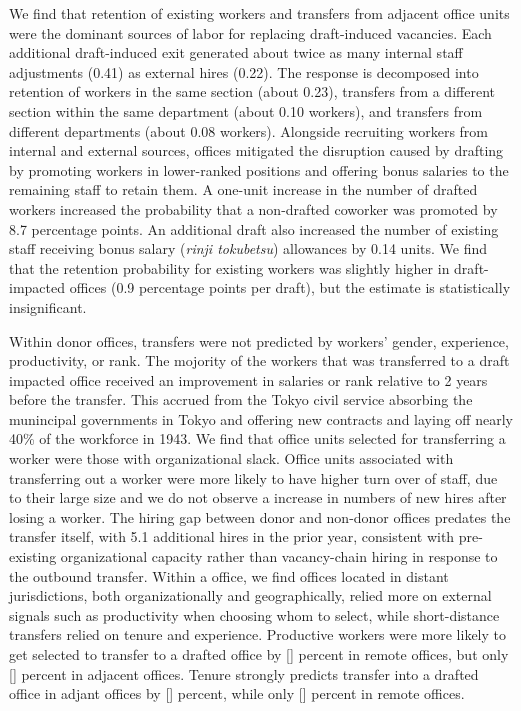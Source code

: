 We find that retention of existing workers and transfers from adjacent office units were the dominant sources of labor for replacing draft-induced vacancies.
Each additional draft-induced exit generated about twice as many internal staff adjustments (0.41) as external hires (0.22).
The response is decomposed into retention of workers in the same section (about 0.23), transfers from a different section within the same department (about 0.10 workers), and transfers from different departments (about 0.08 workers).
Alongside recruiting workers from internal and external sources, offices mitigated the disruption caused by drafting by promoting workers in lower-ranked positions and offering bonus salaries to the remaining staff to retain them.
A one-unit increase in the number of drafted workers increased the probability that a non-drafted coworker was promoted by 8.7 percentage points.
An additional draft also increased the number of existing staff receiving bonus salary (\emph{rinji tokubetsu}) allowances by 0.14 units.
We find that the retention probability for existing workers was slightly higher in draft-impacted offices (0.9 percentage points per draft), but the estimate is statistically insignificant.

Within donor offices, transfers were not predicted by workers' gender, experience, productivity, or rank.
The mojority of the workers that was transferred to a draft impacted office received an improvement in salaries or rank relative to 2 years before the transfer. 
This accrued from the Tokyo civil service absorbing the munincipal governments in Tokyo and offering new contracts and laying off nearly 40\% of the workforce in 1943.
We find that office units selected for transferring a worker were those with organizational slack.
Office units associated with transferring out a worker were more likely to have higher turn over of staff, due to their large size and we do not observe a increase in numbers of new hires after losing a worker.
The hiring gap between donor and non-donor offices predates the transfer itself, with 5.1 additional hires in the prior year, consistent with pre-existing organizational capacity rather than vacancy-chain hiring in response to the outbound transfer.
Within a office, we find offices located in distant jurisdictions, both organizationally and geographically, relied more on external signals such as productivity when choosing whom to select, while short-distance transfers relied on tenure and experience.
Productive workers were more likely to get selected to transfer to a drafted office by [] percent in remote offices, but only [] percent in adjacent offices.
Tenure strongly predicts transfer into a drafted office in adjant offices by [] percent, while only [] percent in remote offices.

